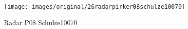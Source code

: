 \begin{figure}[!h] 
\centering 
\texttt{[image: images/original/26radarpirker08schulze10070]}
\caption{Radar P08 Schulze10070}
\label{fig:26radarpirker08schulze10070} 
\end{figure}

